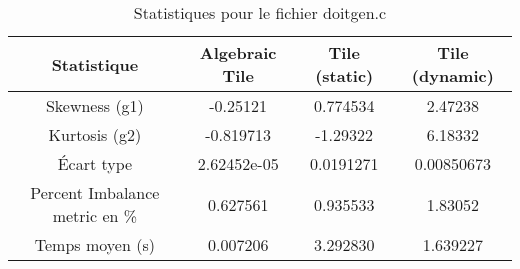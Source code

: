 \documentclass{article}
\begin{document}
\begin{table}[htbp]
  \centering
  \caption{Statistiques pour le fichier doitgen.c}
  \begin{tabular}{|c|c|c|c|}
    \hline
    Statistique & Algebraic Tile & Tile (static) & Tile (dynamic) \\ 
    \hline
    Skewness (g1) & -0.25121 & 0.774534 & 2.47238 \\ 
    Kurtosis (g2) & -0.819713 & -1.29322 & 6.18332 \\ 
    Écart type & 2.62452e-05 & 0.0191271 & 0.00850673\\ 
    Percent Imbalance metric en \% & 0.627561 & 0.935533 & 1.83052\\ 
    Temps moyen (s) & 0.007206 & 3.292830 & 1.639227 \\ 
    \hline
  \end{tabular}
\end{table}
\newpage
\end{document}

